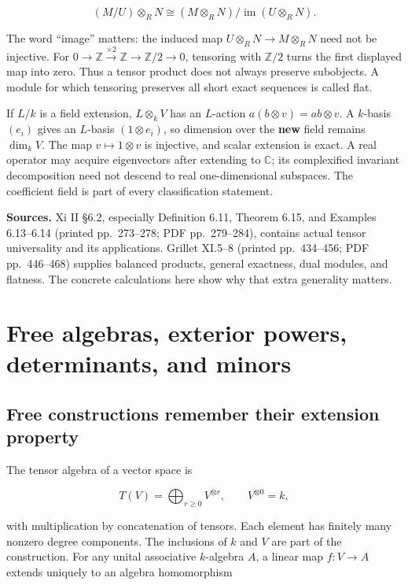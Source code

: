 \documentclass[
  11pt,
]{article}
\begin{document}
\[(M/U)\otimes_R N\cong
(M\otimes_R N)/\operatorname{im}(U\otimes_R N).\]

The word ``image'' matters: the induced map
\(U\otimes_R N\to M\otimes_R N\) need not be injective. For
\(0\to\mathbb Z\xrightarrow{\times2}
\mathbb Z\to\mathbb Z/2\to0\), tensoring with \(\mathbb Z/2\) turns the
first displayed map into zero. Thus a tensor product does not always
preserve subobjects. A module for which tensoring preserves all short
exact sequences is called flat.

If \(L/k\) is a field extension, \(L\otimes_k V\) has an \(L\)-action
\(a(b\otimes v)=ab\otimes v\). A \(k\)-basis \((e_i)\) gives an
\(L\)-basis \((1\otimes e_i)\), so dimension over the \textbf{new} field
remains \(\dim_k V\). The map \(v\mapsto1\otimes v\) is injective, and
scalar extension is exact. A real operator may acquire eigenvectors
after extending to \(\mathbb C\); its complexified invariant
decomposition need not descend to real one-dimensional subspaces. The
coefficient field is part of every classification statement.

\textbf{Sources.} Xi II §6.2, especially Definition 6.11, Theorem 6.15,
and Examples 6.13--6.14 (printed pp.~273--278; PDF pp.~279--284),
contains actual tensor universality and its applications. Grillet
XI.5--8 (printed pp.~434--456; PDF pp.~446--468) supplies balanced
products, general exactness, dual modules, and flatness. The concrete
calculations here show why that extra generality matters.

\section{Free algebras, exterior powers, determinants, and
minors}\label{free-algebras-exterior-powers-determinants-and-minors}

\subsection{Free constructions remember their extension
property}\label{free-constructions-remember-their-extension-property}

The tensor algebra of a vector space is

\[T(V)=\bigoplus_{r\ge0}V^{\otimes r},\qquad V^{\otimes0}=k,\]

with multiplication by concatenation of tensors. Each element has
finitely many nonzero degree components. The inclusions of \(k\) and
\(V\) are part of the construction. For any unital associative
\(k\)-algebra \(A\), a linear map \(f:V\to A\) extends uniquely to an
algebra homomorphism
\end{document}
